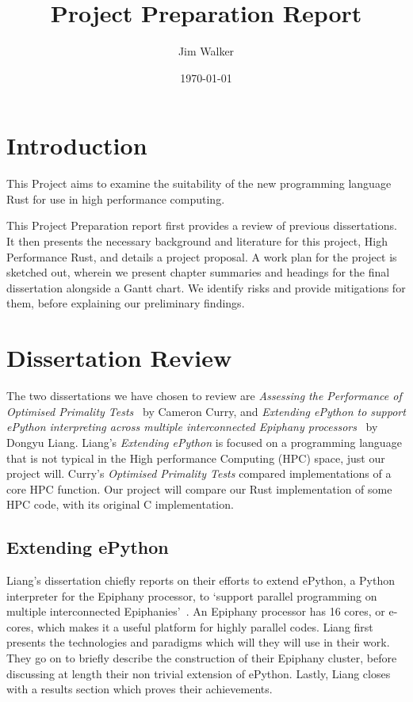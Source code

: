 \documentclass{report}[a4]
\begin{document}
\title{Project Preparation Report}
\author{Jim Walker}
\date{\today}

\makeEPCCtitle

\thispagestyle{empty}

\pagebreak
\tableofcontents
\pagebreak

\chapter{Introduction}
This Project aims to examine the suitability of the new programming language Rust for use in high performance computing.

This Project Preparation report first provides a review of previous dissertations. It then presents the necessary background and literature for this project, High Performance Rust, and details a project proposal. A work plan for the project is sketched out, wherein we present chapter summaries and headings for the final dissertation alongside a Gantt chart. We identify risks and provide mitigations for them, before explaining our preliminary findings.
\chapter{Dissertation Review}
The two dissertations we have chosen to review are \textit{Assessing the Performance of Optimised Primality Tests}~\cite{Curry2016} by Cameron Curry, and \textit{Extending ePython to support ePython interpreting across multiple interconnected Epiphany processors}~\cite{Liang2017} by Dongyu Liang. Liang's \textit{Extending ePython} is focused on a programming language that is not typical in the High performance Computing (HPC) space, just our project will. Curry's \textit{Optimised Primality Tests} compared implementations of a core HPC function. Our project will compare our Rust implementation of some HPC code, with its original C implementation.
\section{Extending ePython}
Liang's dissertation chiefly reports on their efforts to extend ePython, a Python interpreter for the Epiphany processor, to `support parallel programming on multiple interconnected Epiphanies'~\cite{Liang2017}. An Epiphany processor has 16 cores, or e-cores, which makes it a useful platform for highly parallel codes. Liang first presents the technologies and paradigms which will they will use in their work. They go on to briefly describe the construction of their Epiphany cluster, before discussing at length their non trivial extension of ePython. Lastly, Liang closes with a results section which proves their achievements.
\end{document}

